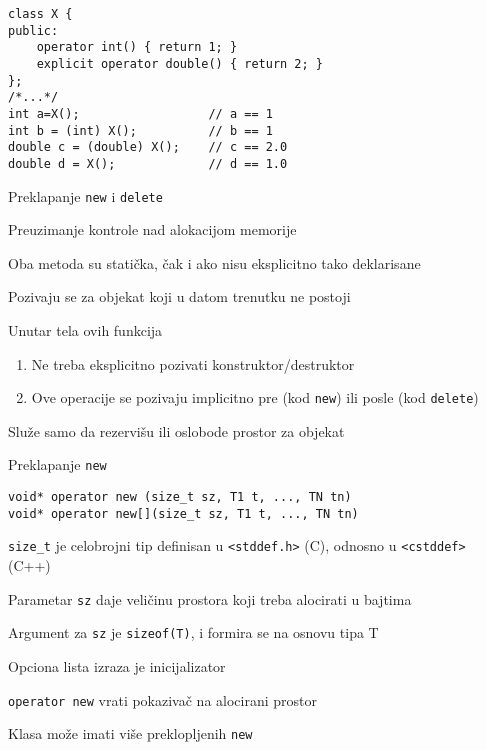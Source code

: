 \documentclass{article}
\newenvironment{xitemize}{%
    
    \itemize
    \larger
}{%
    \enditemize
}
\let\olditemize\itemize
\let\endolditemize\enditemize
\renewenvironment{itemize}{%
    \smaller
    \olditemize
}{%
    \endolditemize
}
\providecommand{\inlinecode}[1]{\texttt{#1}}
\begin{document}
\begin{xitemize}
\begin{itemize}
\begin{lstlisting}
class X {
public:
    operator int() { return 1; }
    explicit operator double() { return 2; }
};
/*...*/
int a=X();                  // a == 1
int b = (int) X();          // b == 1
double c = (double) X();    // c == 2.0
double d = X();             // d == 1.0
    \end{lstlisting}
\end{itemize}
\item Preklapanje \inlinecode{new} i \inlinecode{delete}
\begin{itemize}
    \item Preuzimanje kontrole nad alokacijom memorije
    \item Oba metoda su statička, čak i ako nisu eksplicitno tako deklarisane
    \item Pozivaju se za objekat koji u datom trenutku ne postoji
    \item Unutar tela ovih funkcija
    \begin{enumerate}
        \item Ne treba eksplicitno pozivati konstruktor/destruktor
        \item Ove operacije se pozivaju implicitno pre (kod \inlinecode{new}) ili posle (kod \inlinecode{delete})
    \end{enumerate}
    \item Služe samo da rezervišu ili oslobode prostor za objekat
\end{itemize}
\item Preklapanje \inlinecode{new}
\begin{itemize}
    \item \inlinecode{void* operator new (size\_t sz, T1 t, ..., TN tn)}\\
    \inlinecode{void* operator new[](size\_t sz, T1 t, ..., TN tn)}
    \item \inlinecode{size\_t} je celobrojni tip definisan u \inlinecode{<stddef.h>} (C), odnosno u \inlinecode{<cstddef>} (C++)
    \item Parametar \inlinecode{sz} daje veličinu prostora koji treba alocirati u bajtima
    \item Argument za \inlinecode{sz} je \inlinecode{sizeof(T)}, i formira se na osnovu tipa T
    \item Opciona lista izraza je inicijalizator
    \item \inlinecode{operator new} vrati pokazivač na alocirani prostor
    \item Klasa može imati više preklopljenih \inlinecode{new}
    \begin{lstlisting}

\end{lstlisting}
\end{itemize}
\end{xitemize}
\end{document}
